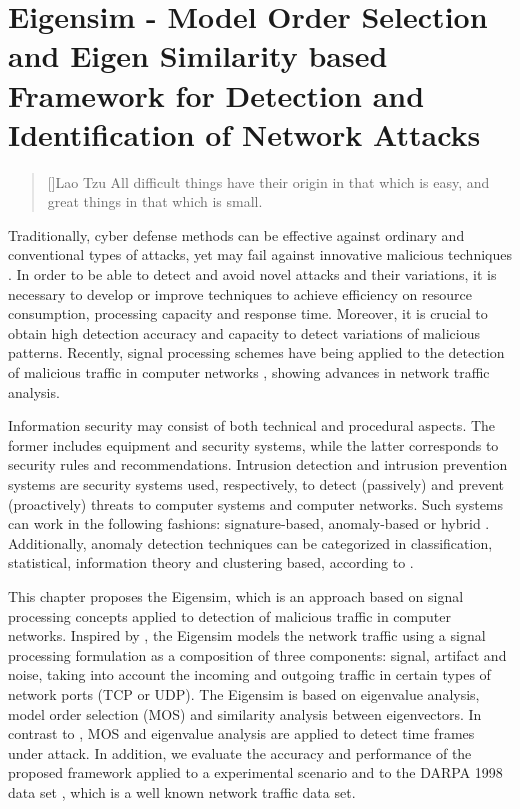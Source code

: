 \chapter{Eigensim - Model Order Selection and Eigen Similarity based Framework for Detection and Identification of Network Attacks}
\label{ch:2_mos_eig_sim}

\begin{quotation}[]{Lao Tzu}
All difficult things have their origin in that which is easy, and great things in that which is small. 
\end{quotation}

Traditionally, cyber defense methods can be effective against ordinary and conventional types of attacks, yet may fail against innovative malicious techniques \cite{lakhina2005mining}. In order to be able to detect and avoid novel attacks and their variations, it is necessary to develop or improve techniques to achieve efficiency on resource consumption, processing capacity and response time. Moreover, it is crucial to obtain high detection accuracy and capacity to detect variations of malicious patterns. Recently, signal processing schemes have being applied to the detection of malicious traffic in computer networks \cite{Lu2009,Huang2009,Zonglin2009,david2011blind,da2012improved,tenorio2013greatest}, showing advances in network traffic analysis.

Information security may consist of both technical and procedural aspects. The former includes equipment and security systems, while the latter corresponds to security rules and recommendations. Intrusion detection and intrusion prevention systems are security systems used, respectively, to detect (passively) and prevent (proactively) threats to computer systems and computer networks. Such systems can work in the following fashions: signature-based, anomaly-based or hybrid \cite{Huang2009,mudzingwa2012study}. Additionally, anomaly detection techniques can be categorized in classification, statistical, information theory and clustering based, according to \cite{bhuyan2014network,ahmed2016survey,osanaiye2016distributed}.

This chapter proposes the Eigensim, which is an approach based on signal processing concepts applied to detection of malicious traffic in computer networks. Inspired by \cite{david2011blind,da2012improved}, the Eigensim models the network traffic using a signal processing formulation as a composition of three components: signal, artifact and noise, taking into account the incoming and outgoing traffic in certain types of network ports (TCP or UDP). The Eigensim is based on eigenvalue analysis, model order selection (MOS) and similarity analysis between eigenvectors. In contrast to \cite{david2011blind,da2012improved,tenorio2013greatest}, MOS and eigenvalue analysis are applied to detect time frames under attack. In addition, we evaluate the accuracy and performance of the proposed framework applied to a experimental scenario and to the DARPA 1998 data set \citep{osanaiye2016distributed}, which is a well known network traffic data set. 

